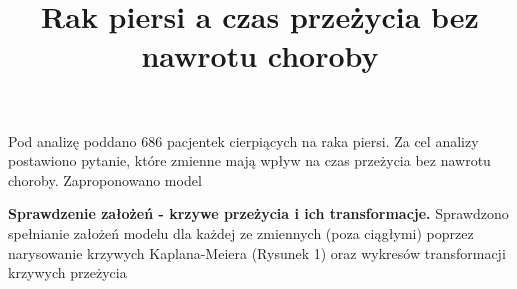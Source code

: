 \documentclass[]{article}
\title{Rak piersi a czas przeżycia bez nawrotu choroby}
\author{}
\date{}
\begin{document}
\maketitle


\thispagestyle{fancy}

Pod analizę poddano 686 pacjentek cierpiących na raka piersi. Za cel
analizy postawiono pytanie, które zmienne mają wpływ na czas przeżycia
bez nawrotu choroby. Zaproponowano model

\textbf{Sprawdzenie założeń - krzywe przeżycia i ich transformacje.}
\newline
Sprawdzono spełnianie założeń modelu dla każdej ze zmiennych (poza
ciągłymi) poprzez narysowanie krzywych Kaplana-Meiera (Rysunek 1) oraz
wykresów transformacji  krzywych przeżycia
\end{document}
